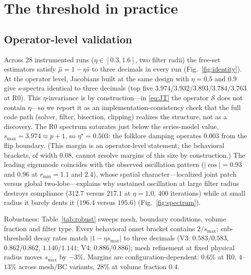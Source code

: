 \documentclass[11pt,a4paper]{article}
\newcommand{\smax}{s_{\max}}
\newcommand{\etastar}{\eta^{\star}}
\newcommand{\muh}{\hat{\mu}}
\newcommand{\sh}{\hat{s}}
\begin{document}
\section{The threshold in practice}\label{sec:threshold}

\subsection{Operator-level validation}\label{sec:validation}

Across 28 instrumented runs ($\eta\in[0.3,1.6]$, two filter radii) the
free-set estimators satisfy $\muh=1-\eta\sh$ to three decimals in every
run (Fig.~\ref{fig:identity}). At the operator level, Jacobians built at
the same design with $\eta=0.5$ and $0.9$ give $s$-spectra identical to
three decimals (top five $3.974/3.932/3.893/3.784/3.763$ at R0). This
$\eta$-invariance is by construction---in \eqref{eq:JT} the operator
$\mathcal S$ does not contain $\eta$---so we report it as an
implementation-consistency check that the full code path (solver,
filter, bisection, clipping) realizes the structure, not as a
discovery. The R0 spectrum saturates
just below the series-model value, $\smax=3.974\approx p{+}1$, so
$\etastar=0.503$: the folklore damping operates $0.003$ from the flip
boundary. (This margin is an operator-level statement; the behavioral
brackets, of width $0.08$, cannot resolve margins of this size by
construction.) The leading eigenmode coincides with the observed
oscillation pattern ($|\cos|=0.93$ and $0.96$ at $r_{\min}=1.1$ and
$2.4$), whose spatial character---localized joint patch versus global
two-lobe---explains why sustained oscillation at large filter radius
destroys compliance ($312.7$ versus $217.1$ at $\eta=1.0$, 400
iterations) while at small radius it barely dents it ($196.4$ versus
$195.6$) (Fig.~\ref{fig:spectrum}).

Robustness: Table~\ref{tab:robust} sweeps mesh, boundary conditions,
volume fraction and filter type. Every behavioral onset bracket contains
$2/\smax$; sub-threshold decay rates match $|1-\eta\smax|$ to three
decimals (V3: $0.583/0.583$, $0.862/0.862$, $1.140/1.141$; V4:
$0.886/0.886$); mesh refinement at fixed physical radius moves $\smax$
by $-3\%$. Margins are configuration-dependent: $0.6\%$ at R0,
$4$--$13\%$ across mesh/BC variants, $28\%$ at volume fraction $0.4$.
\end{document}
